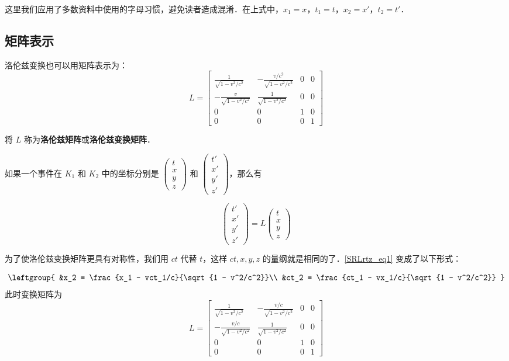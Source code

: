 这里我们应用了多数资料中使用的字母习惯，避免读者造成混淆．在上式中，$x_1=x$，$t_1=t$，$x_2=x'$，$t_2=t'$．

\subsection{矩阵表示}

洛伦兹变换也可以用矩阵表示为：
\begin{equation}\label{SRLrtz_eq4}
L=
\left[\begin{matrix}
\frac{1}{\sqrt{1-v^2/c^2}}& -\frac{v/c^2}{\sqrt{1-v^2/c^2}}& 0& 0\\
-\frac{v}{\sqrt{1-v^2/c^2}}& \frac{1}{\sqrt{1-v^2/c^2}}& 0& 0\\
0&0&1&0\\
0&0&0&1
\end{matrix}\right]
\end{equation}

将 $L$ 称为\textbf{洛伦兹矩阵}或\textbf{洛伦兹变换矩阵}．

如果一个事件在 $K_1$ 和 $K_2$ 中的坐标分别是 $\left(\begin{matrix}   t\\x\\y\\z    \end{matrix}\right)$ 和 $\left(\begin{matrix}   t'\\x'\\y'\\z'    \end{matrix}\right)$，那么有

\begin{equation}
\left(\begin{matrix}   t'\\x'\\y'\\z'    \end{matrix}\right)
=
L
\left(\begin{matrix}   t\\x\\y\\z    \end{matrix}\right)
\end{equation}

为了使洛伦兹变换矩阵更具有对称性，我们用 $ct$ 代替 $t$，这样 $ct,x,y,z$ 的量纲就是相同的了．\autoref{SRLrtz_eq1} 变成了以下形式：

\begin{equation}
\leftgroup{
&x_2 = \frac{x_1 - vct_1/c}{\sqrt{1 - v^2/c^2}}\\
&ct_2 = \frac{ct_1 - vx_1/c}{\sqrt{1 - v^2/c^2}}
}
\end{equation}
此时变换矩阵为
\begin{equation}\label{SRLrtz_eq5}
L=
\left[\begin{matrix}
\frac{1}{\sqrt{1-v^2/c^2}}& -\frac{v/c}{\sqrt{1-v^2/c^2}}& 0& 0\\
-\frac{v/c}{\sqrt{1-v^2/c^2}}& \frac{1}{\sqrt{1-v^2/c^2}}& 0& 0\\
0&0&1&0\\
0&0&0&1
\end{matrix}\right]
\end{equation}



